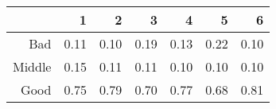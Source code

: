 \begin{table}[ht]
\centering
\begin{tabular}{rrrrrrr}
  \hline
 & 1 & 2 & 3 & 4 & 5 & 6 \\ 
  \hline
Bad & 0.11 & 0.10 & 0.19 & 0.13 & 0.22 & 0.10 \\ 
  Middle & 0.15 & 0.11 & 0.11 & 0.10 & 0.10 & 0.10 \\ 
  Good & 0.75 & 0.79 & 0.70 & 0.77 & 0.68 & 0.81 \\ 
   \hline
\end{tabular}
\end{table}

